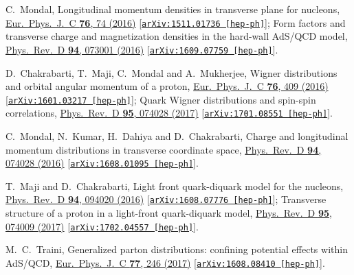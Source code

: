 \documentclass[aps,prd,preprint,groupedaddress]{revtex4-1}
\begin{document}
\begin{thebibliography}{99}
  C.~Mondal,
  Longitudinal momentum densities in transverse plane for nucleons,
  \href{https://link.springer.com/article/10.1140%2Fepjc%2Fs10052-016-3922-2}{Eur.\ Phys.\ J.\ C {\bf 76},  74 (2016)}
  [\href{https://arxiv.org/abs/1511.01736}{\tt arXiv:1511.01736 [hep-ph]}];
  Form factors and transverse charge and magnetization densities in the hard-wall AdS/QCD model,
  \href{https://journals.aps.org/prd/abstract/10.1103/PhysRevD.94.073001}{Phys.\ Rev.\ D {\bf 94}, 073001 (2016)}
  [\href{https://arxiv.org/abs/1609.07759}{\tt arXiv:1609.07759 [hep-ph]}].


  D.~Chakrabarti, T.~Maji, C.~Mondal and A.~Mukherjee,
  Wigner distributions and orbital angular momentum of a proton,
  \href{https://link.springer.com/article/10.1140%2Fepjc%2Fs10052-016-4258-7}{Eur.\ Phys.\ J.\ C {\bf 76},  409 (2016)}
  [\href{https://arxiv.org/abs/1601.03217}{\tt arXiv:1601.03217 [hep-ph]}];
  Quark Wigner distributions and spin-spin correlations,
  \href{https://journals.aps.org/prd/abstract/10.1103/PhysRevD.95.074028}{Phys.\ Rev.\ D {\bf 95}, 074028 (2017)}
  [\href{https://arxiv.org/abs/1701.08551}{\tt arXiv:1701.08551 [hep-ph]}].


  C.~Mondal, N.~Kumar, H.~Dahiya and D.~Chakrabarti,
  Charge and longitudinal momentum distributions in transverse coordinate space,
  \href{https://journals.aps.org/prd/abstract/10.1103/PhysRevD.94.074028}{Phys.\ Rev.\ D {\bf 94},  074028 (2016)}
  [\href{https://arxiv.org/abs/1608.01095}{\tt arXiv:1608.01095 [hep-ph]}].


  T.~Maji and D.~Chakrabarti,
  Light front quark-diquark model for the nucleons,
  \href{https://journals.aps.org/prd/abstract/10.1103/PhysRevD.94.094020}{Phys.\ Rev.\ D {\bf 94}, 094020 (2016)}
  [\href{https://arxiv.org/abs/1608.07776}{\tt arXiv:1608.07776 [hep-ph]}];
  Transverse structure of a proton in a light-front quark-diquark model,
  \href{https://journals.aps.org/prd/abstract/10.1103/PhysRevD.95.074009}{Phys.\ Rev.\ D {\bf 95}, 074009 (2017)}
  [\href{https://arxiv.org/abs/1702.04557}{\tt arXiv:1702.04557 [hep-ph]}].


  M.~C.~Traini,
  Generalized parton distributions: confining potential effects within AdS/QCD,
  \href{https://link.springer.com/article/10.1140%2Fepjc%2Fs10052-017-4775-z}{Eur.\ Phys.\ J.\ C {\bf 77},  246 (2017)}
  [\href{https://arxiv.org/abs/1608.08410}{\tt arXiv:1608.08410 [hep-ph]}].



\end{thebibliography}
\end{document}
